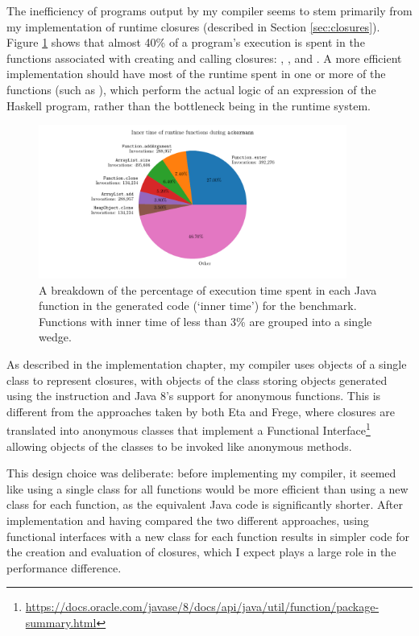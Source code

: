\documentclass[dissertation.tex]{subfiles}
\begin{document}
{{        The inefficiency of programs output by my compiler seems to stem primarily from my implementation of runtime closures (described in Section \ref{sec:closures}). Figure \ref{fig:inner-time} shows that almost 40\% of a program's execution is spent in the functions associated with creating and calling closures: , , and . A more efficient implementation should have most of the runtime spent in one or more of the  functions (such as ), which perform the actual logic of an expression of the Haskell program, rather than the bottleneck being in the runtime system.

        \begin{figure}[h]
            \centering
            \captionsetup{width=0.8\textwidth}
            \includegraphics[width=0.9\textwidth]{graphs/perf_profile_ackermann.pdf}
            \caption{A breakdown of the percentage of execution time spent in each Java function in the generated code (`inner time') for the  benchmark. Functions with inner time of less than 3\% are grouped into a single wedge.}
            \label{fig:inner-time}
        \end{figure}

        As described in the implementation chapter, my compiler uses objects of a single class to represent closures, with objects of the class storing  objects generated using the  instruction and Java 8's support for anonymous functions. This is different from the approaches taken by both Eta and Frege, where closures are translated into anonymous classes that implement a Functional Interface\footnote{\url{https://docs.oracle.com/javase/8/docs/api/java/util/function/package-summary.html}} allowing objects of the classes to be invoked like anonymous methods.

        This design choice was deliberate: before implementing my compiler, it seemed like using a single class for all functions would be more efficient than using a new class for each function, as the equivalent Java code is significantly shorter. After implementation and having compared the two different approaches, using functional interfaces with a new class for each function results in simpler code for the creation and evaluation of closures, which I expect plays a large role in the performance difference.

}}
\end{document}
